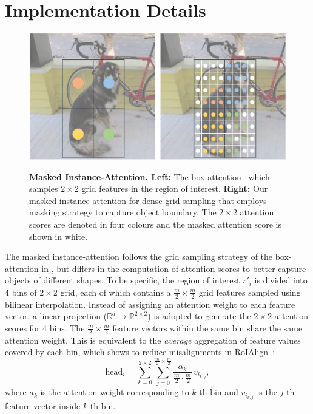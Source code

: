 \section{Implementation Details}


\begin{figure}[b]
    \centering
    {
        \includegraphics[width=\linewidth]{fig/attn_comp.png}
    }
    {
        \caption{\textbf{Masked Instance-Attention. Left:} The box-attention~\citep{nguyen2022boxer} which samples $2\times2$ grid features in the region of interest. \textbf{Right:} Our masked instance-attention for dense grid sampling that employs masking strategy to capture object boundary. The $2\times2$ attention scores are denoted in four colours and the masked attention score is shown in white.}
        \label{fig:masked_instance_attn}
    }%
\end{figure}

 The masked instance-attention follows the grid sampling strategy of the box-attention in \cite{nguyen2022boxer}, but differs in the computation of attention scores to better capture objects of different shapes. To be specific, the region of interest $r'_i$ is divided into 4 bins of $2 \times 2$ grid, each of which contains a $\frac{m}{2} \times \frac{m}{2}$ grid features sampled using bilinear interpolation. Instead of assigning an attention weight to each feature vector, a linear projection ($\mathbb{R}^d \rightarrow \mathbb{R}^{2 \times 2}$) is adopted to generate the $2 \times 2$ attention scores for 4 bins. The $\frac{m}{2} \times \frac{m}{2}$ feature vectors within the same bin share the same attention weight. This is equivalent to the \textit{average} aggregation of feature values covered by each bin, which shows to reduce misalignments in RoIAlign~\citep{he2017maskrcnn}:
\begin{equation}
    \mathrm{head}_i = \sum_{k=0}^{2 \times 2} \sum_{j=0}^{\frac{m}{2} \times \frac{m}{2}} \frac{\alpha_k}{\frac{m}{2} \cdot \frac{m}{2}} \, v_{i_{k,j}},
\end{equation}
where $a_k$ is the attention weight corresponding to $k$-th bin and $v_{i_{k,j}}$ is the $j$-th feature vector inside $k$-th bin.

